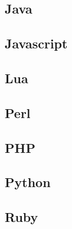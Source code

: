 \documentclass{KodeBook}
\begin{document}
\subsection{Java}

%

\subsection{Javascript} 

%

%


\subsection{Lua}


\subsection{Perl}

%

\subsection{PHP}

%

\subsection{Python}

%

\subsection{Ruby}

%
\end{document}
